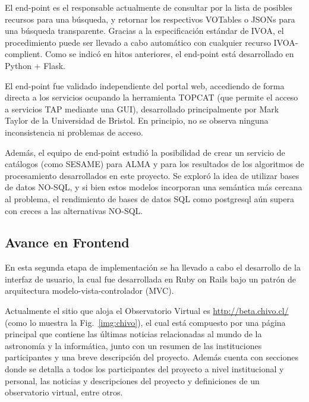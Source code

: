 El end-point es el responsable actualmente de consultar por la lista
de posibles recursos para una búsqueda, y retornar los respectivos VOTables
o JSONs para una búsqueda transparente. Gracias a la especificación estándar
de IVOA, el procedimiento puede ser llevado a cabo automático con cualquier
recurso IVOA-complient. Como se indicó en hitos anteriores, el end-point
está desarrollado en Python + Flask.

El end-point fue validado independiente del portal web,
accediendo de forma directa a los servicios ocupando la
herramienta TOPCAT (que permite el acceso a servicios TAP 
mediante una GUI), desarrollado principalmente por Mark Taylor
de la Universidad de Bristol. En principio, no se observa
ninguna inconsistencia ni problemas de acceso.

Además, el equipo de end-point estudió la posibilidad
de crear un servicio de catálogos (como SESAME) para ALMA y para 
los resultados de los algoritmos de procesamiento
desarrollados en este proyecto. Se exploró la idea
de utilizar bases de datos NO-SQL, y si bien estos 
modelos incorporan una semántica más cercana al problema, 
el rendimiento de bases de datos SQL como postgresql aún
supera con creces a las alternativas NO-SQL.

\subsection{Avance en Frontend}

En esta segunda etapa de implementación se ha llevado a cabo el
desarrollo de la interfaz de usuario, la cual fue desarrollada en
Ruby on Rails bajo un patrón de arquitectura modelo-vista-controlador
(MVC).

Actualmente el sitio que aloja el Observatorio Virtual es
\url{http://beta.chivo.cl/} (como lo muestra la Fig.~\ref{img:chivo}),
el cual está compuesto por una página principal que contiene las
últimas noticias relacionadas al mundo de la astronomía y la
informática, junto con un resumen de las instituciones participantes y
una breve descripción del proyecto. Además cuenta con secciones donde
se detalla a todos los participantes del proyecto a nivel
institucional y personal, las noticias y descripciones del proyecto y
definiciones de un observatorio virtual, entre otros.

